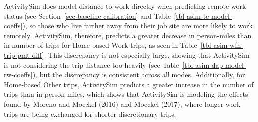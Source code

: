 \documentclass[fancy, oneside, mastersfancy, ms]{byuthesis}
\begin{document}
ActivitySim does model distance to work directly when predicting remote
work status (see Section~\ref{sec-baseline-calibration} and
Table~\ref{tbl-asim-tc-model-coeffs}), so those who live farther away
from their job site are more likely to work remotely. ActivitySim,
therefore, predicts a greater decrease in person-miles than in number of
trips for Home-based Work trips, as seen in
Table~\ref{tbl-asim-wfh-trip-pmt-diff}. This discrepancy is not
especially large, showing that ActivitySim is not considering the trip
distance too heavily (see Table~\ref{tbl-asim-dap-model-rw-coeffs}), but
the discrepancy is consistent across all modes. Additionally, for
Home-based Other trips, ActivitySim predicts a greater increase in the
number of trips than in person-miles, which shows that ActivitySim is
modeling the effects found by Moreno and Moeckel (2016) and Moeckel
(2017), where longer work trips are being exchanged for shorter
discretionary trips.
\end{document}
